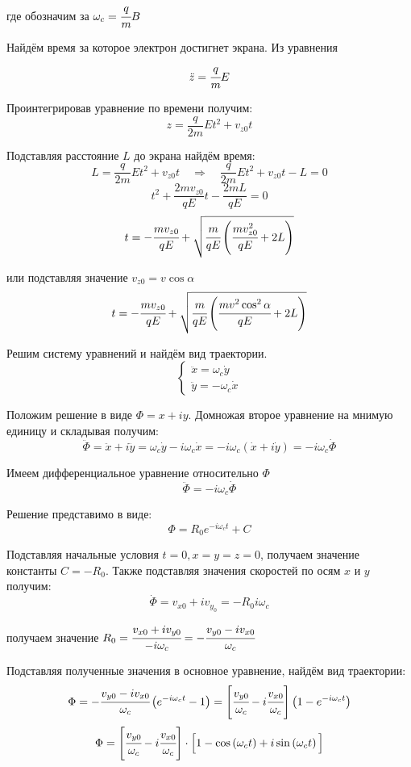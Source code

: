 где обозначим за \( \omega_c = \cfrac{q}{m}B \)

Найдём время за которое электрон достигнет экрана. Из уравнения 
\[ \ddot{z} = \cfrac{q}{m}E \]

Проинтегрировав уравнение по времени получим:
\[
	z = \frac{q}{2m}Et^2 + v_{z0}t
\]

Подставляя расстояние \( L \) до экрана найдём время:
\[
	L = \frac{q}{2m}Et^2 + v_{z0}t \quad\Rightarrow\quad
	\frac{q}{2m}Et^2 + v_{z0}t - L = 0
\]
\[
	t^2 + \frac{2mv_{z0}}{qE}t - \frac{2mL}{qE} = 0
\]
\[
	t = -\cfrac{mv_{z0}}{qE} + 
	\sqrt{ \cfrac{m}{qE}\left( \cfrac{mv^2_{z0}}{qE} + 2L \right)}
\]

или подставляя значение \( v_{z0} = v\cos\alpha \)
\[
	t = -\cfrac{mv_{z0}}{qE} + 
	\sqrt{ \cfrac{m}{qE}\left( \cfrac{mv^2\cos^2\alpha}{qE} + 2L \right)}
\]

Решим систему уравнений и найдём вид траектории.
\[
	\left\{ \begin{array}{ll}
		\ddot{x} = \omega_c\dot{y} \\
		\ddot{y} = -\omega_c\dot{x}
	\end{array}\right.
\]

Положим решение в виде \( \Phi = x + iy \). Домножая второе уравнение на 
мнимую единицу и складывая получим:
\[
	\ddot{\Phi} = \ddot{x} + i\ddot{y} = 
	\omega_c\dot{y} - i\omega_c\dot{x} = 
	-i\omega_c\left( \dot{x} + i\dot{y} \right) = 
	-i\omega_c\dot{\Phi}
\]

Имеем дифференциальное уравнение относительно \( \Phi \)
\[\ddot{\Phi} = -i\omega_c\dot{\Phi} \]

Решение представимо в виде:
\[
	\Phi = R_0 e^{-i\omega_c t} + C
\]

Подставляя начальные условия \( t = 0, x = y = z = 0 \), получаем значение 
константы \( C = -R_0 \). Также подставляя значения скоростей по осям 
\( x \) и \( y \) получим:
\[
	\dot{\Phi} = v_{x0} + iv_{y_0} = -R_0 i\omega_c
\]

получаем значение 
\( 
	R_0  = \cfrac{v_{x0} + iv_{y0}}{-i\omega_c} = 
	-\cfrac{v_{y0} - iv_{x0}}{\omega_c} 
\)

Подставляя полученные значения в основное уравнение, найдём вид траектории:
\[
	\Phi = -\cfrac{v_{y0} - iv_{x0}}{\omega_c} 
	\left( e^{-i\omega_c t} - 1 \right ) = 
	\left[ \cfrac{v_{y0}}{\omega_c} - i \cfrac{v_{x0}}{\omega_c} \right]
	\left( 1 - e^{-i\omega_c t} \right)
\]
\[
	\Phi = 
	\left[ \cfrac{v_{y0}}{\omega_c} - i \cfrac{v_{x0}}{\omega_c} \right]
	\cdot\Big[ 1 - \cos\left(\omega_c t\right) + 
		i\sin\left( \omega_c t\right) \Big] 
\]


